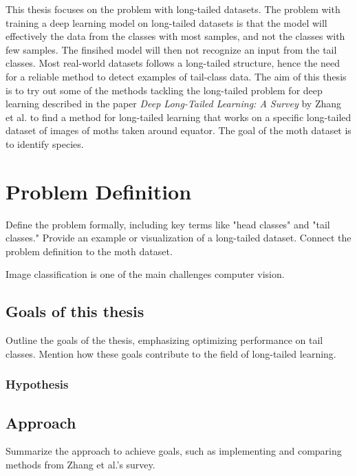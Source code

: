 

\label{sec:introduction}
This thesis focuses on the problem with long-tailed datasets. The problem with training a deep learning model on long-tailed datasets is that the model will effectively 
the data from the classes with most samples, and not the classes with few samples. The finsihed model will then not recognize an input from the tail classes. Most real-world
datasets follows a long-tailed structure, hence the need for a reliable method to detect examples of tail-class data. The aim of this thesis is to try out some of the methods tackling the long-tailed problem for deep learning described in the paper \textit{Deep Long-Tailed Learning: A Survey} by Zhang et al.\cite{zhang2023deep} to find a method for long-tailed learning that works on a specific long-tailed dataset of images of moths taken around equator. The goal of the moth dataset is to identify species.

\section{Problem Definition}
Define the problem formally, including key terms like "head classes" and "tail classes."
Provide an example or visualization of a long-tailed dataset.
Connect the problem definition to the moth dataset.

Image classification is one of the main challenges computer vision.

\subsection{Goals of this thesis}
Outline the goals of the thesis, emphasizing optimizing performance on tail classes.
Mention how these goals contribute to the field of long-tailed learning.

\subsubsection{Hypothesis}


\subsection{Approach}
Summarize the approach to achieve goals, such as implementing and comparing methods from Zhang et al.’s survey.

